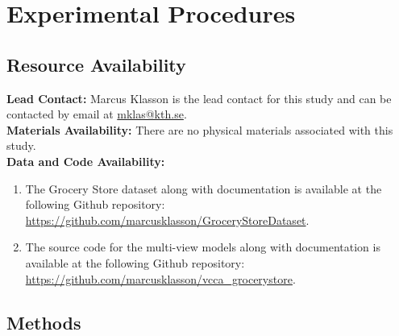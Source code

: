 \section{Experimental Procedures}
\label{paperB:sec:experimental_procedures}

\subsection{Resource Availability}

\textbf{Lead Contact:} Marcus Klasson is the lead contact for this study and can be contacted by email at \url{mklas@kth.se}. \\

\noindent\textbf{Materials Availability:} There are no physical materials associated with this study. \\

\noindent\textbf{Data and Code Availability:} 
\begin{enumerate}[noitemsep,topsep=0pt]%
\item The Grocery Store dataset along with documentation is available at the following Github repository: {\small \url{https://github.com/marcusklasson/GroceryStoreDataset}}.
\item The source code for the multi-view models along with documentation is available at the following Github repository: {\small \url{https://github.com/marcusklasson/vcca_grocerystore}}.
\end{enumerate}

\subsection{Methods}\label{paperB:sec:methods}

